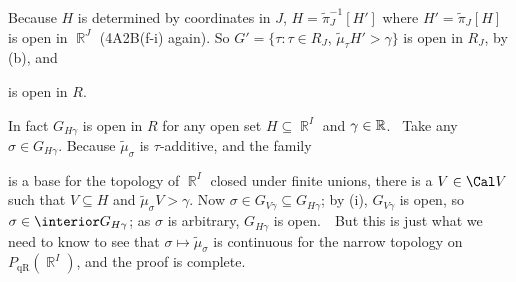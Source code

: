 {Because $H$ is determined by coordinates in $J$, $H=\tilde\pi_J^{-1}[H']$
where $H'=\tilde\pi_J[H]$ is open in $\BbbR^J$ (4A2B(f-i) again).   So
$G'=\{\tau:\tau\in R_J$, $\tilde\mu_{\tau}H'>\gamma\}$ is open in $R_J$, by
(b), and


\noindent is open in $R$.\ \Qed

\medskip

 In fact $G_{H\gamma}$ is open in $R$ for any open set
$H\subseteq\BbbR^I$ and $\gamma\in\Bbb R$.   \Prf\ Take any
$\sigma\in G_{H\gamma}$.   Because $\tilde\mu_{\sigma}$ is
$\tau$-additive, and the family


\noindent is a base for the topology of $\BbbR^I$ closed under finite
unions, there is a $V\in\Cal V$ such that $V\subseteq H$ and
$\tilde\mu_{\sigma}V>\gamma$.   Now
$\sigma\in G_{V\gamma}\subseteq G_{H\gamma}$;  by (i),
$G_{V\gamma}$ is open, so $\sigma\in\interior G_{H\gamma}$;  as $\sigma$ is
arbitrary, $G_{H\gamma}$ is open.\ \QeD\  But this is just what we need to
know to see that $\sigma\mapsto\tilde\mu_{\sigma}$ is continuous for the
narrow topology on $P_{\text{qR}}(\BbbR^I)$, and the proof is complete.
}%

